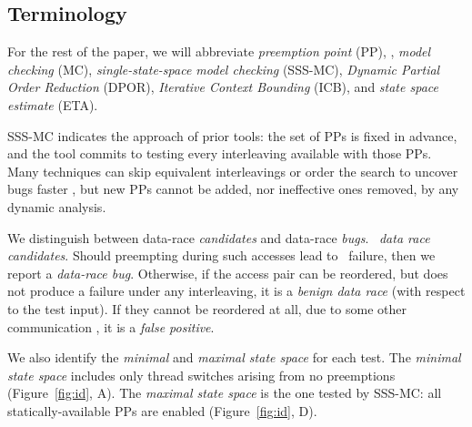 \subsection{Terminology}

For the rest of the paper, we will abbreviate {\em preemption point} (PP),
,
{\em model checking} (MC),
{\em single-state-space model checking} (SSS-MC), %
{\em Dynamic Partial Order Reduction} (DPOR),
{\em Iterative Context Bounding} (ICB),
and {\em state space estimate} (ETA).

SSS-MC indicates the approach of prior tools:
the set of PPs is fixed in advance, and the tool commits to testing every interleaving available with those PPs.
Many techniques can skip equivalent interleavings or order the search to uncover bugs faster \cite{dpor,demeter,chess-icb,gambit,smc-empirical-study},
but new PPs cannot be added, nor ineffective ones removed, by any dynamic analysis.

We distinguish between data-race {\em candidates} and data-race {\em bugs}.
~{\em data race candidates}.
Should %
preempting during such accesses
lead to ~failure, then we report a {\em data-race bug}.
Otherwise, if the access pair can be reordered,
but does not produce a failure under any interleaving, it is a {\em benign data race} (with respect to the test input).
If they cannot be reordered at all, due to some other communication , it is a {\em false positive}.

We also identify the {\em minimal} and {\em maximal state space} for each test.
The {\em minimal state space} includes only thread switches arising from no preemptions (Figure~\ref{fig:id}, A).
The {\em maximal state space} is the one tested by SSS-MC: all statically-available PPs are enabled (Figure~\ref{fig:id}, D).
